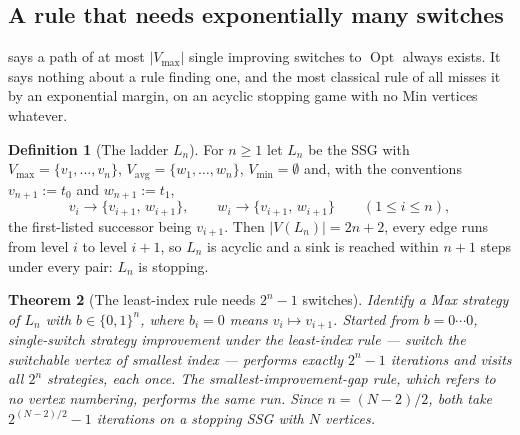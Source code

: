 \documentclass[11pt]{article}
\theoremstyle{plain}
\newtheorem{theorem}{Theorem}[section]
\theoremstyle{definition}
\newtheorem{definition}[theorem]{Definition}
\DeclareMathOperator{\Opt}{Opt}
\newcommand{\Vmax}{V_{\max}}
\newcommand{\Vmin}{V_{\min}}
\newcommand{\Vavg}{V_{\mathrm{avg}}}
\begin{document}
\subsection{A rule that needs exponentially many switches}

 says a path of at most $|\Vmax|$ single improving
switches to $\Opt$ always exists. It says nothing about a rule finding
one, and the most classical rule of all misses it by an exponential
margin, on an acyclic stopping game with no Min vertices whatever.

\begin{definition}[The ladder $L_n$]\label{def:ladder}
For $n\ge1$ let $L_n$ be the SSG with $\Vmax=\{v_1,\dots,v_n\}$,
$\Vavg=\{w_1,\dots,w_n\}$, $\Vmin=\emptyset$ and, with the conventions
$v_{n+1}:=t_0$ and $w_{n+1}:=t_1$,
\[
  v_i\longrightarrow\{v_{i+1},\,w_{i+1}\},\qquad
  w_i\longrightarrow\{v_{i+1},\,w_{i+1}\}\qquad(1\le i\le n),
\]
the first-listed successor being $v_{i+1}$. Then $|V(L_n)|=2n+2$, every
edge runs from level $i$ to level $i+1$, so $L_n$ is acyclic and a sink
is reached within $n+1$ steps under every pair: $L_n$ is stopping.
\end{definition}

\begin{theorem}[The least-index rule needs $2^{n}-1$ switches]\label{thm:ladder}
Identify a Max strategy of $L_n$ with $b\in\{0,1\}^n$, where $b_i=0$ means
$v_i\mapsto v_{i+1}$. Started from $b=0\cdots0$, single-switch strategy
improvement under the \emph{least-index} rule --- switch the switchable
vertex of smallest index --- performs exactly $2^{n}-1$ iterations and
visits all $2^{n}$ strategies, each once. The \emph{smallest-improvement-gap}
rule, which refers to no vertex numbering, performs the same run. Since
$n=(N-2)/2$, both take $2^{(N-2)/2}-1$ iterations on a stopping SSG with
$N$ vertices.
\end{theorem}
\end{document}
